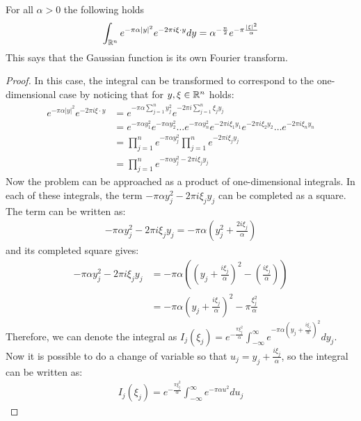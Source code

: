\begin{theorem}\label{thm:fourier-gaussian}
    For all $\alpha>0$ the following holds
    \begin{equation*}
        \int_{\mathbb R^n}e^{-\pi\alpha|y|^2}e^{-2\pi i\xi\cdot y}dy=\alpha^{-\frac{n}{2}}e^{-\pi\frac{|\xi|^2}{\alpha}}
    \end{equation*}
    This says that the Gaussian function is its own Fourier transform.
\end{theorem}
\begin{proof}
    In this case, the integral can be transformed to correspond to the one-dimensional case by noticing that for $y,\xi\in\mathbb R^n$ holds:
    \begin{align*}
        e^{-\pi\alpha|y|^2}e^{-2\pi i\xi\cdot y}&=e^{-\pi\alpha\sum_{j=1}^ny_j^2}e^{-2\pi i\sum_{j=1}^n\xi_jy_j} \\
        &=e^{-\pi\alpha y_1^2}e^{-\pi\alpha y_2^2}\ldots e^{-\pi\alpha y_n^2}e^{-2\pi i\xi_1y_1}e^{-2\pi i\xi_2y_2}\ldots e^{-2\pi i\xi_ny_n}\\
        &=\prod_{j=1}^ne^{-\pi\alpha y_j^2}\prod_{j=1}^ne^{-2\pi i\xi_jy_j} \\
        &=\prod_{j=1}^ne^{-\pi\alpha y_j^2-2\pi i\xi_jy_j}
    \end{align*}
    Now the problem can be approached as a product of one-dimensional integrals. In each of these integrals, the term $-\pi\alpha y_j^2-2\pi i\xi_jy_j$ can be completed as a square. The term can be written as:
    \begin{gather*}
        -\pi\alpha y_j^2-2\pi i\xi_jy_j=-\pi\alpha\left(y_j^2+\frac{2i\xi_j}{\alpha} \right)
    \end{gather*}
    and its completed square gives:
    \begin{align*}
        -\pi\alpha y_j^2-2\pi i\xi_jy_j&=-\pi\alpha\left(\left(y_j+\frac{i\xi_j}{\alpha}\right)^2-\left(\frac{i\xi_j}{\alpha}\right)\right) \\
        &=-\pi\alpha\left(y_j+\frac{i\xi_j}{\alpha}\right)^2-\pi\frac{\xi_j^2}{\alpha}
    \end{align*}
    Therefore, we can denote the integral as $I_j(\xi_j)=e^{-\frac{\pi \xi_j^2}{\alpha}}\int_{-\infty}^\infty e^{-\pi\alpha\left(y_j+\frac{i\xi_j}{\alpha}\right)^2}dy_j$. Now it is possible to do a change of variable so that $u_j=y_j+\frac{i\xi_j}{\alpha}$, so the integral can be written as:
    \begin{gather*}
        I_j(\xi_j)=e^{-\frac{\pi \xi_j^2}{\alpha}}\int_{-\infty}^\infty e^{-\pi\alpha u^2}du_j

\end{gather*}
\end{proof}
